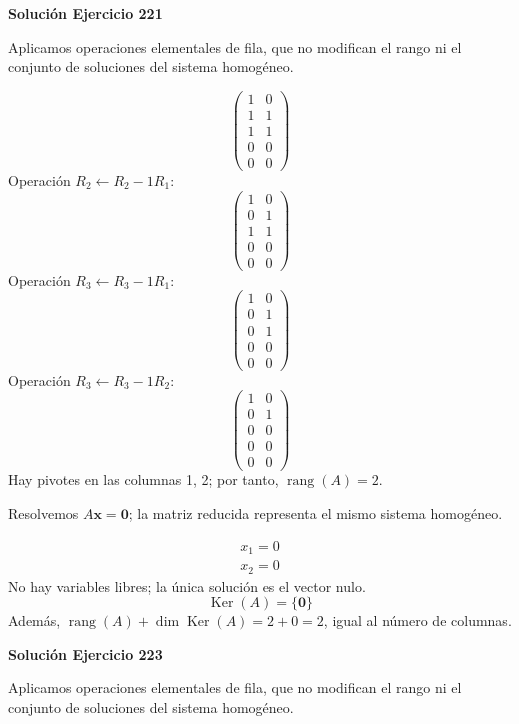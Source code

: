 \documentclass[12pt]{article}
\newcommand{\rang}{\operatorname{rang}}
\newcommand{\Ker}{\operatorname{Ker}}
\newcommand{\vect}[1]{\boldsymbol{#1}}
\begin{document}
\par\bigskip\noindent\textbf{Solución Ejercicio 221}\par\nobreak
Aplicamos operaciones elementales de fila, que no modifican el rango ni el conjunto de soluciones del sistema homogéneo.

\[
\begin{pmatrix}1&0\\1&1\\1&1\\0&0\\0&0\end{pmatrix}
\]
Operación $R_{2}\leftarrow R_{2}-1R_{1}$:
\[
\begin{pmatrix}1&0\\0&1\\1&1\\0&0\\0&0\end{pmatrix}
\]
Operación $R_{3}\leftarrow R_{3}-1R_{1}$:
\[
\begin{pmatrix}1&0\\0&1\\0&1\\0&0\\0&0\end{pmatrix}
\]
Operación $R_{3}\leftarrow R_{3}-1R_{2}$:
\[
\begin{pmatrix}1&0\\0&1\\0&0\\0&0\\0&0\end{pmatrix}
\]
Hay pivotes en las columnas 1, 2; por tanto, $\boxed{\rang(A)=2}$.

Resolvemos $A\vect x=\vect0$; la matriz reducida representa el mismo sistema homogéneo.

\[
\begin{aligned}x_{1}=0\\x_{2}=0\end{aligned}
\]
No hay variables libres; la única solución es el vector nulo.
\[
\boxed{\Ker(A)=\{\vect0\}}
\]
Además, $\rang(A)+\dim\Ker(A)=2+0=2$, igual al número de columnas.


\par\bigskip\noindent\textbf{Solución Ejercicio 223}\par\nobreak
Aplicamos operaciones elementales de fila, que no modifican el rango ni el conjunto de soluciones del sistema homogéneo.
\end{document}
